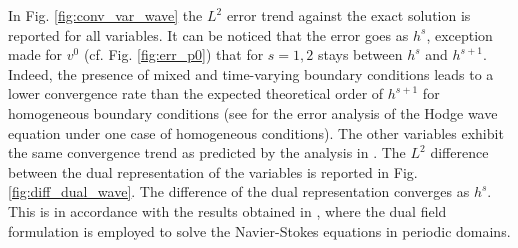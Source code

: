 \documentclass{elsarticle}
\begin{document}
In Fig. \ref{fig:conv_var_wave} the $L^2$ error trend against the exact solution is reported for all variables. It can be noticed that the error goes as $h^s$, exception made for $v^0$ (cf. Fig. \ref{fig:err_p0}) that for $s=1, 2$ stays between $h^s$ and $h^{s+1}$. Indeed, the presence of mixed and time-varying boundary conditions leads to a lower convergence rate than the expected theoretical order of $h^{s+1}$ for homogeneous boundary conditions (see \cite{wu2021hodgewave} for the error analysis of the Hodge wave equation under one case of homogeneous conditions). The other variables exhibit the same convergence trend as predicted by the analysis in \cite{wu2021hodgewave}. The $L^2$ difference between the dual representation of the variables is reported in Fig. \ref{fig:diff_dual_wave}. The difference of the dual representation converges as $h^s$. This is in accordance with the results obtained in \cite{zhang2021mass}, where the dual field formulation is employed to solve the Navier-Stokes equations in periodic domains.
 
\end{document}
